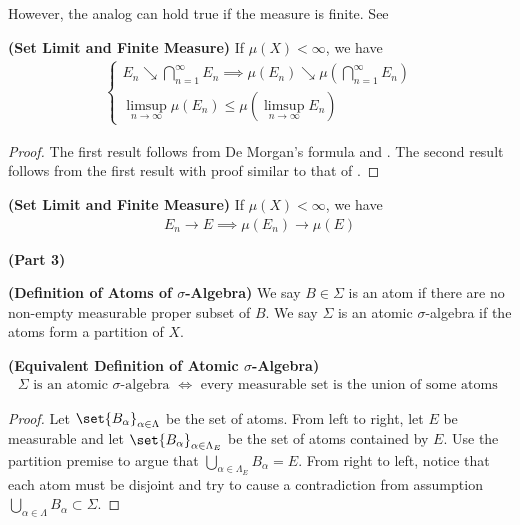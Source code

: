 \documentclass{report}
\begin{document}
\begin{mdframed}
However, the analog can hold true if the measure is finite. See  
\end{mdframed}
\begin{theorem}
\label{0.7.13}
\textbf{(Set Limit and Finite Measure)} If $\mu (X)<\infty$, we have 
\begin{align*}
\begin{cases}
  E_n \searrow\bigcap_{n=1}^\infty E_n \implies \mu (E_n)\searrow \mu (\bigcap_{n=1}^\infty E_n) \\
\limsup_{n\to\infty} \mu (E_n)\leq \mu (\limsup_{n\to\infty}  E_n)
\end{cases}
\end{align*}
\end{theorem}
\begin{proof}
The first result follows from De Morgan's formula and . The second result follows from the first result with proof similar to that of .
\end{proof}
\begin{corollary}
\label{0.7.14}
\textbf{(Set Limit and Finite Measure)} If $\mu(X)<\infty$, we have 
\begin{align*}
E_n \to E \implies \mu(E_n)\to \mu (E)
\end{align*}
\end{corollary}
\textbf{(Part 3)} 
\begin{definition}
\label{0.7.15}
\textbf{(Definition of Atoms of $\sigma$-Algebra)} We say $B \in \Sigma$ is an atom if there are no non-empty measurable proper subset of $B$. We say $\Sigma$ is an atomic $\sigma$-algebra if the atoms form a partition of $X$. 
\end{definition}
\begin{theorem}
\label{0.7.16}
\textbf{(Equivalent Definition of Atomic $\sigma$-Algebra)} 
\begin{align*}
\Sigma\text{ is an atomic }\sigma\text{-algebra }\iff \text{ every measurable set is the union of some atoms }
\end{align*}
\end{theorem}
\begin{proof}
Let $\set{B_\alpha }_{\alpha  \in \Lambda }$ be the set of atoms. From left to right, let $E$ be measurable and let $\set{B_\alpha }_{\alpha \in \Lambda _E}$ be the set of atoms contained by $E$. Use the partition premise to argue that $\bigcup_{\alpha  \in \Lambda  _E} B_\alpha =E$. From right to left, notice that each atom must be disjoint and try to cause a contradiction from assumption $\bigcup_{\alpha  \in \Lambda }B_\alpha \subset \Sigma$.
\end{proof}
\end{document}

